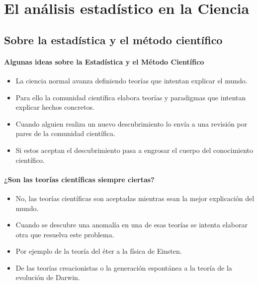  




\chapter{El análisis estadístico en la Ciencia}

\section{Sobre la estadística y el método científico}
\begin{frame}
\frametitle{Algunas ideas sobre la  Estadística y el Método Científico}
\begin{itemize}
\item La ciencia normal avanza definiendo teorías que intentan explicar el mundo.
\item Para ello  la comunidad científica elabora teorías y paradigmas que intentan explicar hechos concretos.
\item Cuando  alguien realiza un nuevo descubrimiento lo envía a una revisión por pares de la comunidad científica.
\item Si estos aceptan el descubrimiento pasa a engrosar  el cuerpo del conocimiento científico.
\end{itemize}
\end{frame}
 
\begin{frame}
\frametitle{¿Son las teorías científicas siempre ciertas?}
\begin{itemize}
\item No, las teorías científicas son aceptadas mientras sean la mejor explicación del mundo.
\item Cuando se descubre una anomalía en una de esas teorías se intenta elaborar otra que  resuelva este problema.
\item Por ejemplo de la teoría del éter a la física de Einsten.
\item De las teorías creacionistas o la generación espontánea a la teoría de la evolución de Darwin.
\end{itemize}
\end{frame}


